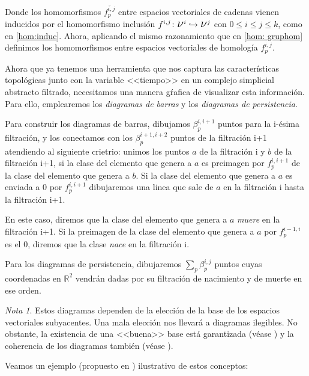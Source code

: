 \documentclass[12pt, a4paper, twoside]{book}
\numberwithin{equation}{section}
\theoremstyle{definition}
\theoremstyle{remark}
\newtheorem*{remark}{Nota}
\theoremstyle{plain}
\begin{document}
	Donde los homomorfismos $\overline{f_{p}^{i,j}}$ entre espacios 
	vectoriales de 
	cadenas vienen inducidos por el homomorfismo inclusión $f^{i,j}\colon 
	\text{{\Large $\nu$}$^{i}$} \xhookrightarrow{} 
	\text{{\Large $\nu$}$^{j}$}$ con $0\leq i \leq j \leq k$, como en 
	\ref{hom:induc}. Ahora, aplicando el mismo razonamiento que en 
	\ref{hom: gruphom} definimos los homomorfismos entre espacios 
	vectoriales de 
	homología $f^{i,j}_{p}$.

	Ahora que ya tenemos una herramienta que nos captura las 
	características topológicas junto con la variable <<tiempo>> en un 
	complejo simplicial abstracto filtrado, necesitamos una manera gŕafica 
	de visualizar esta información. Para ello, emplearemos los  
	\emph{diagramas de barras} y los \emph{diagramas de persistencia}.
	
	Para construir los diagramas de barras, dibujamos $\beta_{p}^{i,i+1}$ 
	puntos para la i-ésima filtración, y los conectamos con los 
	$\beta_{p}^{i+1,i+2}$ puntos de la filtración i+1 atendiendo al 
	siguiente crietrio: unimos los puntos $a$ de la filtración i y $b$ de
	la filtración i+1, si la clase del elemento que genera a $a$ es 
	preimagen por $f_{p}^{i,i+1}$ de la clase del elemento que genera a 
	$b$. Si la clase del elemento que genera a $a$ es enviada a 0 por 
	$f_{p}^{i,i+1}$ dibujaremos una linea que sale de $a$ en la filtración
	i hasta la filtración i+1. 

	En este caso, diremos que la clase del 
	elemento que genera a $a$ \emph{muere} en la filtración i+1. Si la 
	preimagen de la clase del elemento que genera a $a$ por 
	$f_{p}^{i-1,i}$ es el 0, diremos que la clase \emph{nace} en la 
	filtración i.

	Para los diagramas de persistencia, dibujaremos $\sum_{p}
	\beta_{p}^{i,j}$ puntos cuyas coordenadas en $\mathbb{R}^{2}$ vendrán 
	dadas por su filtración de nacimiento y de muerte en ese orden. 

	\begin{remark}
		Estos diagramas dependen de la elección de la base de los 
		espacios vectoriales subyacentes. Una mala elección nos 
		llevará a diagramas ilegibles. No obstante, la existencia de 
		una <<buena>> base está garantizada (véase 
		\cite{BaseDiagExt-Carlsson}) y la 
		coherencia de los diagramas también (véase 
		\cite{BaseDiag-Cavanna}).   
	\end{remark}

	Veamos un ejemplo (propuesto en \cite{Intro-Otter}) ilustrativo de estos 
	conceptos:
\end{document}
